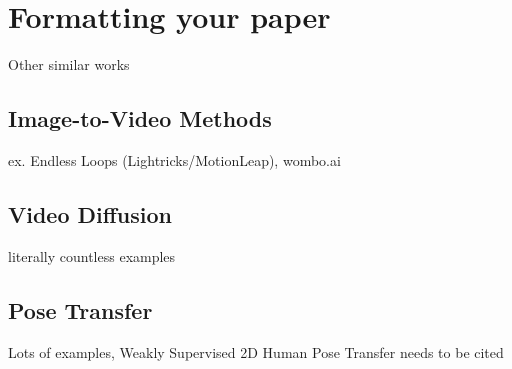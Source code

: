 \section{Formatting your paper}
\label{sec:formatting}

Other similar works

\subsection{Image-to-Video Methods}

ex. Endless Loops (Lightricks/MotionLeap), wombo.ai


\subsection{Video Diffusion}

literally countless examples

\subsection{Pose Transfer}

Lots of examples, Weakly Supervised 2D Human Pose Transfer needs to be cited
